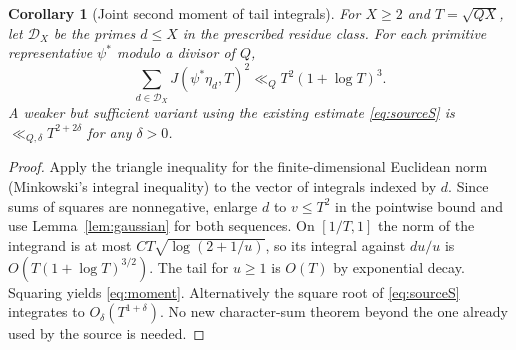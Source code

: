 \documentclass[11pt,a4paper]{article}
\newtheorem{corollary}[theorem]{Corollary}
\theoremstyle{remark}\newtheorem{remark}[theorem]{Remark}
\begin{document}
\begin{corollary}[Joint second moment of tail integrals]\label{cor:moment}
For $X\ge2$ and $T=\sqrt{QX}$, let $\mathcal D_X$ be the primes $d\le X$ in the prescribed residue class. For each primitive representative $\psi^*$ modulo a divisor of $Q$,
\begin{equation}\label{eq:moment}
\sum_{d\in\mathcal D_X}J(\psi^*\eta_d,T)^2\ll_Q T^2(1+\log T)^3.
\end{equation}
A weaker but sufficient variant using the existing estimate \eqref{eq:sourceS} is $\ll_{Q,\delta}T^{2+2\delta}$ for any $\delta>0$.
\end{corollary}
\begin{proof}
Apply the triangle inequality for the finite-dimensional Euclidean norm (Minkowski's integral inequality) to the vector of integrals indexed by $d$. Since sums of squares are nonnegative, enlarge $d$ to $v\le T^2$ in the pointwise bound and use Lemma~\ref{lem:gaussian} for both sequences. On $[1/T,1]$ the norm of the integrand is at most $CT\sqrt{\log(2+1/u)}$, so its integral against $du/u$ is $O(T(1+\log T)^{3/2})$. The tail for $u\ge1$ is $O(T)$ by exponential decay. Squaring yields \eqref{eq:moment}. Alternatively the square root of \eqref{eq:sourceS} integrates to $O_\delta(T^{1+\delta})$. No new character-sum theorem beyond the one already used by the source is needed.
\end{proof}
\end{document}
